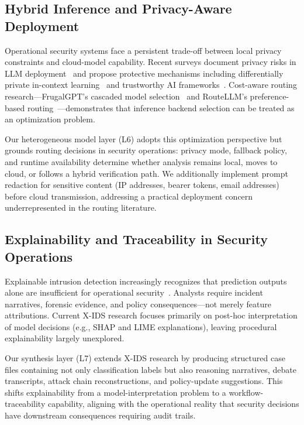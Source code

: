 \subsection{Hybrid Inference and Privacy-Aware Deployment}
\label{subsec:hybrid-inference}

Operational security systems face a persistent trade-off between local privacy constraints and cloud-model capability. Recent surveys document privacy risks in LLM deployment~\cite{chen2025privacy} and propose protective mechanisms including differentially private in-context learning~\cite{tang2024dpicl} and trustworthy AI frameworks~\cite{feretzakis2024trustworthy}. Cost-aware routing research---FrugalGPT's cascaded model selection~\cite{chen2023frugalgpt} and RouteLLM's preference-based routing~\cite{ong2024routellm}---demonstrates that inference backend selection can be treated as an optimization problem.

Our heterogeneous model layer (L6) adopts this optimization perspective but grounds routing decisions in security operations: privacy mode, fallback policy, and runtime availability determine whether analysis remains local, moves to cloud, or follows a hybrid verification path. We additionally implement prompt redaction for sensitive content (IP addresses, bearer tokens, email addresses) before cloud transmission, addressing a practical deployment concern underrepresented in the routing literature.

\subsection{Explainability and Traceability in Security Operations}
\label{subsec:xai-security}

Explainable intrusion detection increasingly recognizes that prediction outputs alone are insufficient for operational security~\cite{neupane2022xids,hermosilla2025systems,hermosilla2025forensic}. Analysts require incident narratives, forensic evidence, and policy consequences---not merely feature attributions. Current X-IDS research focuses primarily on post-hoc interpretation of model decisions (e.g., SHAP and LIME explanations), leaving procedural explainability largely unexplored.

Our synthesis layer (L7) extends X-IDS research by producing structured case files containing not only classification labels but also reasoning narratives, debate transcripts, attack chain reconstructions, and policy-update suggestions. This shifts explainability from a model-interpretation problem to a workflow-traceability capability, aligning with the operational reality that security decisions have downstream consequences requiring audit trails.

